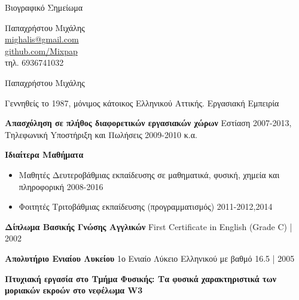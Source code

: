 \documentclass[a4paper,12pt,final]{memoir}
\newcommand{\SmallSep}{\vspace{0.25em}}
\newenvironment{AboutMe}
	{\ignorespaces\textbf{\color{RoyalBlue} \textbullet{}}}
\newcommand{\CVSection}[1]
	{\Large{#1}\par
	\SmallSep\normalsize\normalfont}
\newcommand{\CVItem}[2]
	{\textbf{\color{RoyalBlue} #1} #2}
\newcommand{\location}[1]{ %
\small{\color{headings}#1}}
\newenvironment{tightitemize} %
{\vspace{-\topsep}\begin{itemize}\itemsep1pt \parskip0pt \parsep0pt}
{\end{itemize}\vspace{-\topsep}}
\begin{document}
\begin{flushright}
Βιογραφικό Σημείωμα
\vspace{0.75cm}

\small
	Παπαχρήστου Μιχάλης \\
	\url{mighalis@gmail.com}  \\
	\url{github.com/Mixpap} \\
	τηλ. 6936741032
\end{flushright}\normalsize
\framebreak


\Huge {\color{RoyalBlue} Παπαχρήστου Μιχάλης} \\

\normalsize\normalfont

\begin{AboutMe}
Γεννηθείς το 1987, μόνιμος κάτοικος Ελληνικού Αττικής.
\end{AboutMe}

\CVSection{Εργασιακή Εμπειρία}

\SmallSep

\CVItem{Aπασχόληση σε πλήθος διαφορετικών εργασιακών χώρων}{\newline}
\location{Eστίαση 2007-2013, Tηλεφωνική Yποστήριξη και Πωλήσεις 2009-2010 κ.α.}


\CVItem{Ιδιαίτερα Μαθήματα}{}
\begin{tightitemize}
	\item Μαθητές Δευτεροβάθμιας εκπαίδευσης σε μαθηματικά, φυσική, χημεία και πληροφορική \location{2008-2016}
	\item Φοιτητές Τριτοβάθμιας εκπαίδευσης (προγραμματισμός)
	\location{2011-2012,2014}
\end{tightitemize}
\SmallSep

\CVItem{Δίπλωμα Βασικής Γνώσης Αγγλικών}{\newline}
\location{First Certificate in English (Grade C) | 2002}
\SmallSep

\CVItem{Απολυτήριο Ενιαίου Λυκείου}{\newline}
\location{1ο Ενιαίο Λύκειο Ελληνικού με βαθμό 16.5 | 2005}
\SmallSep

\CVItem{Πτυχιακή εργασία στο Τμήμα Φυσικής: Τα φυσικά χαρακτηριστικά των μοριακών εκροών στο νεφέλωμα W3 \newline}
\SmallSep
\end{document}
